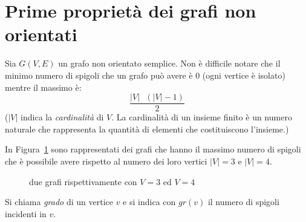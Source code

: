 \section{Prime proprietà dei grafi non orientati}

Sia $G(V,E)$ un grafo non orientato semplice.
Non è difficile notare che il minimo numero di spigoli che un grafo può avere è $0$ (ogni vertice è isolato) mentre il massimo è:
\[ \frac{|V|\text{ }(|V|-1)}{2} \]
($|V|$ indica la \emph{cardinalità} di $V$. La cardinalità di un insieme finito è un numero naturale che rappresenta la quantità di elementi che costituiscono l'insieme.)
\begin{ese} In Figura~\ref{fig:card} sono rappresentati dei grafi che hanno il massimo
numero di spigoli che è possibile avere rispetto al numero dei loro vertici $|V| = 3$ e $|V| = 4$.
\begin{figure}[!ht]		
    \centering
        \hspace{1cm}
        \caption{due grafi rispettivamente con $V = 3$ ed $V = 4$} \label{fig:card}
    \end{figure}
\end{ese}

\begin{defn} Si chiama \emph{grado} di un vertice $v$ e si indica con $gr(v)$ il
numero di spigoli incidenti in $v$.
\end{defn}

